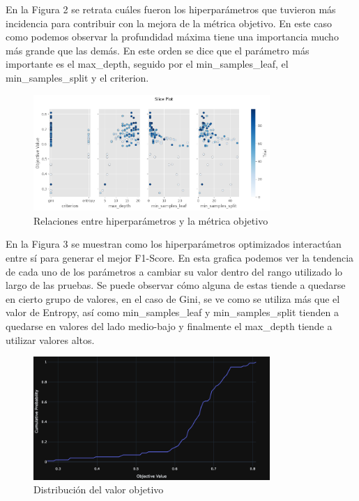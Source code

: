 \documentclass[12pt,a4paper]{article}
\begin{document}
En la Figura 2 se retrata cuáles fueron los hiperparámetros que tuvieron más incidencia para contribuir
con la mejora de la métrica objetivo. En este caso como podemos observar la profundidad máxima tiene una
importancia mucho más grande que las demás.
En este orden se dice que el parámetro más importante es el max_depth,
seguido por el min_samples_leaf, el min_samples_split y el criterion.

\begin{figure}[H]
  \centering
  \includegraphics[width=0.8\textwidth]{../img/SliceDecisionTree.png}
  \caption{Relaciones entre hiperparámetros y la métrica objetivo}\label{fig:decison-tree-slice}
\end{figure}

En la Figura 3 se muestran como los hiperparámetros optimizados interactúan entre sí para generar el mejor F1-Score.
En esta grafica podemos ver la tendencia de cada uno de los parámetros
a cambiar su valor dentro del rango utilizado lo largo de las pruebas.
Se puede observar cómo alguna de estas tiende a quedarse en cierto grupo de valores,
en el caso de Gini, se ve como se utiliza más que el valor de Entropy, así como min_samples_leaf y min_samples_split
tienden a quedarse en valores del lado medio-bajo y finalmente el max_depth tiende a utilizar valores altos.

\begin{figure}[H]
  \centering
  \includegraphics[width=0.8\textwidth]{../img/EDFDecisionTree.png}
  \caption{Distribución del valor objetivo}\label{fig:edf-decision-tree}
\end{figure}
\end{document}
